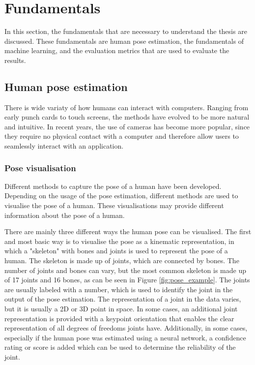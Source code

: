 \section{Fundamentals}
In this section, the fundamentals that are necessary to understand the thesis are discussed. These fundamentals are human pose estimation, the fundamentals of machine learning, and the evaluation metrics that are used to evaluate the results. 

\subsection{Human pose estimation}

There is wide variaty of how humans can interact with computers. Ranging from early punch cards to touch screens, the methods have evolved to be more natural and intuitive. In recent years, the use of cameras has become more popular, since they require no physical contact with a computer and therefore allow users to seamlessly interact with an application.

\subsubsection{Pose visualisation}

Different methods to capture the pose of a human have been developed. Depending on the usage of the pose estimation, different methods are used to visualise the pose of a human. These visualisations may provide different information about the pose of a human.

There are mainly three different ways the human pose can be visualised. The first and most basic way is to visualise the pose as a kinematic representation, in which a "skeleton" with bones and joints is used to represent the pose of a human. The skeleton is made up of joints, which are connected by bones. The number of joints and bones can vary, but the most common skeleton is made up of 17 joints and 16 bones, as can be seen in Figure \ref{fig:pose_example}. The joints are usually labeled with a number, which is used to identify the joint in the output of the pose estimation. The representation of a joint in the data varies, but it is usually a 2D or 3D point in space. In some cases, an additional joint representation is provided with a keypoint orientation that enables the clear representation of all degrees of freedoms joints have\cite{KeypointOrientation}. Additionally, in some cases, especially if the human pose was estimated using a neural network, a confidence rating or score is added which can be used to determine the reliability of the joint.

